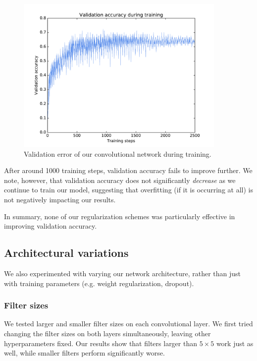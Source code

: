 \documentclass{article}
\begin{document}
\begin{multicols}{2}
\begin{figure}[t]
   \centering
   \includegraphics[width=4in]{img/2-4-4-validation-acc-new.pdf}
   \caption{Validation error of our convolutional network during training.}
   \label{fig:2-4-4-validation-acc}
\end{figure}

After around 1000 training steps,
validation accuracy fails to improve further.
We note, however, that validation accuracy
does not significantly \emph{decrease}
as we continue to train our model,
suggesting that overfitting (if it is occurring at all)
is not negatively impacting our results.

In summary, none of our regularization schemes
was particularly effective in improving validation accuracy.



\subsection{Architectural variations}

We also experimented with varying our network architecture,
rather than just with training parameters
(e.g. weight regularization, dropout).


\subsubsection{Filter sizes}

We tested larger and smaller filter sizes
on each convolutional layer.
We first tried changing the filter sizes on both layers simultaneously,
leaving other hyperparameters fixed.
Our results show that filters larger than $5\times 5$
work just as well,
while smaller filters perform significantly worse.


\end{multicols}
\end{document}
